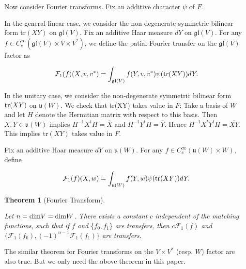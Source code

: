 \documentclass[11pt, oneside,reqno]{amsart}   	%
\newtheorem{theorem}{Theorem}[section]
\begin{document}
Now consider Fourier transforms. Fix an additive character $\psi$ of $F$.

In the general linear case, we consider the non-degenerate symmetric bilinear form tr$(XY)$ on $\mathfrak{gl}(V)$. Fix an additive Haar measure $dY$ on $\mathfrak{gl}(V)$. For any $f \in C_c^\infty(\mathfrak{gl}(V)\times V\times V^*)$, we define the patial Fourier transfer on the $\mathfrak{gl}(V)$ factor as

$$\mathcal{F}_1(f)(X,v,v^*)=\int_{\mathfrak{gl}(V)}f(Y,v,v^*)\psi(\textup{tr}(XY))dY.$$

In the unitary case, we consider the non-degenerate symmetric bilinear form $\textup{tr}(XY)$ on $\mathfrak{u}(W)$. We check that tr(XY) takes value in $F$: Take a basis of $W$ and let $H$ denote the Hermitian matrix with respect to this basis. Then $X, Y \in \mathfrak{u}(W)$ implies $H^{-1}X^tH= \overline{X}$ and $H^{-1}Y^tH= \overline{Y}$. Hence  $H^{-1}X^tY^tH= \overline{XY}$. This implies tr$(XY)$ takes value in $F$.

Fix an additive Haar measure $dY$ on $\mathfrak{u}(W)$. For any $f \in C_c^\infty(\mathfrak{u}(W)\times W)$, define

$$\mathcal{F}_1(f)(X,w)=\int_{\mathfrak{u}(W)}f(Y,w)\psi(\textup{tr}(XY))dY.$$

\begin{theorem}[Fourier Transform] \label{JR commute}

Let $n=\textup{dim}V=\textup{dim}W$. There exists a constant $c$ independent of the matching functions, such that if $f$ and $\{f_0,f_1\}$ are transfers, then $c\mathcal{F}_1(f)$ and $\{\mathcal{F}_1(f_0),(-1)^{n-1}\mathcal{F}_1(f_1)\}$ are transfers.

\end{theorem}

The similar theorem for Fourier transforms on the $V\times V^*$ (resp. $W$) factor are also true. But we only need the above theorem in this paper.
\end{document}
